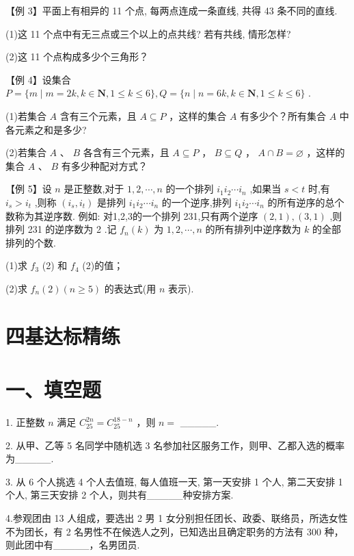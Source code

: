 【例 3】平面上有相异的 11 个点, 每两点连成一条直线, 共得 43 条不同的直线.

(1)这 11 个点中有无三点或三个以上的点共线? 若有共线, 情形怎样?

(2)这 11 个点构成多少个三角形？

【例 4】设集合 $P = \{ m \mid  m = {2k},k \in  \mathbf{N},1 \leq  k \leq  6\} ,Q = \{ n \mid  n = {6k},k \in  \mathbf{N},1 \leq  k \leq  6\}$ .

(1)若集合 $A$ 含有三个元素，且 $A \subseteq  P$ ，这样的集合 $A$ 有多少个？所有集合 $A$ 中各元素之和是多少?

(2)若集合 $A$ 、 $B$ 各含有三个元素，且 $A \subseteq  P$ ， $B \subseteq  Q$ ， $A \cap  B = \varnothing$ ，这样的集合 $A$ 、 $B$ 有多少种配对方式？

【例 5】设 $n$ 是正整数,对于 $1,2,\cdots ,n$ 的一个排列 ${i}_{1}{i}_{2}\cdots {i}_{n}$ ,如果当 $s < t$ 时,有 ${i}_{s} > {i}_{t}$ ,则称 $\left( {{i}_{s},{i}_{t}}\right)$ 是排列 ${i}_{1}{i}_{2}\cdots {i}_{n}$ 的一个逆序,排列 ${i}_{1}{i}_{2}\cdots {i}_{n}$ 的所有逆序的总个数称为其逆序数. 例如: 对1,2,3的一个排列 231,只有两个逆序 $\left( {2,1}\right) ,\left( {3,1}\right)$ ,则排列 231 的逆序数为 2 .记 ${f}_{n}\left( k\right)$ 为 $1,2,\cdots ,n$ 的所有排列中逆序数为 $k$ 的全部排列的个数.

(1)求 ${f}_{3}$ (2) 和 ${f}_{4}$ (2)的值；

(2)求 ${f}_{n}\left( 2\right) \left( {n \geq  5}\right)$ 的表达式(用 $n$ 表示).

\section*{四基达标精练}

\section*{一、填空题}

1. 正整数 $n$ 满足 ${{C}}_{25}^{2n} = {{C}}_{25}^{{18} - n}$ ，则 $n =$ \_\_\_\_\_.

2. 从甲、乙等 5 名同学中随机选 3 名参加社区服务工作，则甲、乙都入选的概率为\_\_\_\_\_.

3. 从 6 个人挑选 4 个人去值班, 每人值班一天, 第一天安排 1 个人, 第二天安排 1 个人, 第三天安排 2 个人，则共有\_\_\_\_\_种安排方案.

4.参观团由 13 人组成，要选出 2 男 1 女分别担任团长、政委、联络员，所选女性不为团长，有 2 名男性不在候选人之列，已知选出且确定职务的方法有 300 种，则此团中有\_\_\_\_\_，名男团员.

